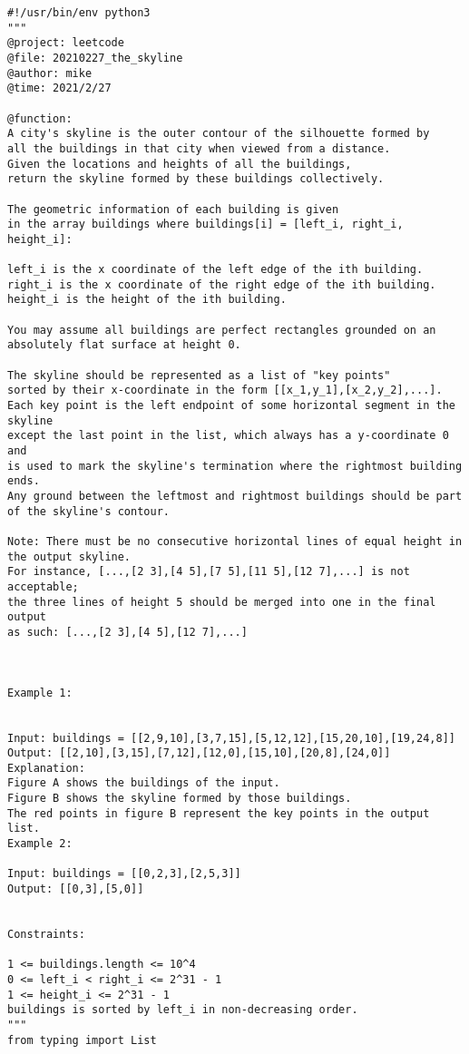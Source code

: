 \begin{lstlisting}
#!/usr/bin/env python3
"""
@project: leetcode
@file: 20210227_the_skyline
@author: mike
@time: 2021/2/27
 
@function:
A city's skyline is the outer contour of the silhouette formed by
all the buildings in that city when viewed from a distance.
Given the locations and heights of all the buildings,
return the skyline formed by these buildings collectively.

The geometric information of each building is given
in the array buildings where buildings[i] = [left_i, right_i, height_i]:

left_i is the x coordinate of the left edge of the ith building.
right_i is the x coordinate of the right edge of the ith building.
height_i is the height of the ith building.

You may assume all buildings are perfect rectangles grounded on an absolutely flat surface at height 0.

The skyline should be represented as a list of "key points"
sorted by their x-coordinate in the form [[x_1,y_1],[x_2,y_2],...].
Each key point is the left endpoint of some horizontal segment in the skyline
except the last point in the list, which always has a y-coordinate 0 and
is used to mark the skyline's termination where the rightmost building ends.
Any ground between the leftmost and rightmost buildings should be part of the skyline's contour.

Note: There must be no consecutive horizontal lines of equal height in the output skyline.
For instance, [...,[2 3],[4 5],[7 5],[11 5],[12 7],...] is not acceptable;
the three lines of height 5 should be merged into one in the final output
as such: [...,[2 3],[4 5],[12 7],...]



Example 1:


Input: buildings = [[2,9,10],[3,7,15],[5,12,12],[15,20,10],[19,24,8]]
Output: [[2,10],[3,15],[7,12],[12,0],[15,10],[20,8],[24,0]]
Explanation:
Figure A shows the buildings of the input.
Figure B shows the skyline formed by those buildings.
The red points in figure B represent the key points in the output list.
Example 2:

Input: buildings = [[0,2,3],[2,5,3]]
Output: [[0,3],[5,0]]


Constraints:

1 <= buildings.length <= 10^4
0 <= left_i < right_i <= 2^31 - 1
1 <= height_i <= 2^31 - 1
buildings is sorted by left_i in non-decreasing order.
"""
from typing import List



\end{lstlisting}
